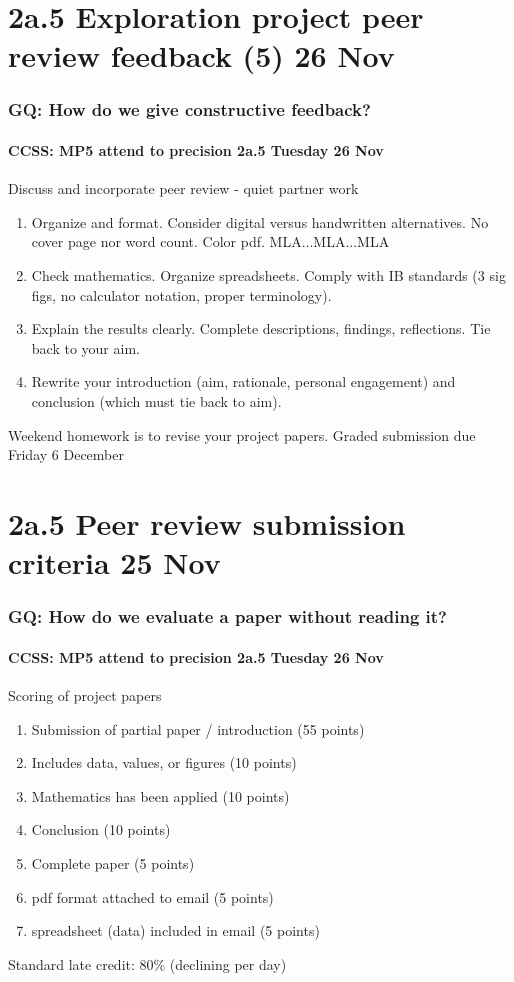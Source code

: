 \documentclass{beamer}
\begin{document}
\section{2a.5 Exploration project peer review feedback (5) 26 Nov}
\frame
{
  \frametitle{GQ: How do we give constructive feedback?}
  \framesubtitle{CCSS: MP5 attend to precision \hfill \alert{2a.5 Tuesday 26 Nov}}
  \begin{block}{Discuss and incorporate peer review - quiet partner work}
  \begin{enumerate}
      \item Organize and format. Consider digital versus handwritten alternatives. No cover page nor word count. Color pdf. MLA...MLA...MLA
      \item Check mathematics. Organize spreadsheets. Comply with IB standards (3 sig figs, no calculator notation, proper terminology).
      \item Explain the results clearly. Complete descriptions, findings, reflections. Tie back to your aim.
      \item Rewrite your introduction (aim, rationale, personal engagement) and  conclusion (which must tie back to aim). 
  \end{enumerate}
  \end{block}
  Weekend homework is to revise your project papers. Graded submission \alert{due Friday 6 December} 
}

\section{2a.5 Peer review submission criteria 25 Nov}
\frame
{
  \frametitle{GQ: How do we evaluate a paper without reading it?}
  \framesubtitle{CCSS: MP5 attend to precision \hfill \alert{2a.5 Tuesday 26 Nov}}

  \begin{block}{Scoring of project papers}
  \begin{enumerate}
      \item Submission of partial paper / introduction (55 points) 
      \item Includes data, values, or figures (10 points)
      \item Mathematics has been applied (10 points)
      \item Conclusion (10 points)
      \item Complete paper (5 points)
      \item pdf format attached to email (5 points)
      \item spreadsheet (data) included in email (5 points)
  \end{enumerate}
  \end{block}
  Standard late credit: 80\% (declining per day) 
}
\end{document}
